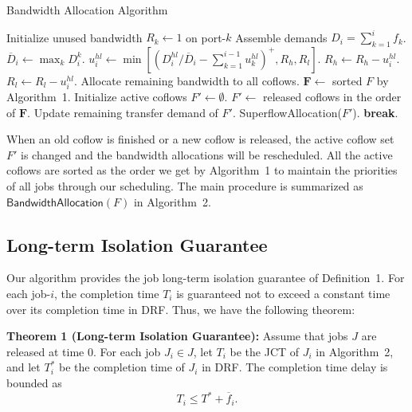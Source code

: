 \documentclass[10pt,journal,compsoc]{IEEEtran}
\begin{document}
\begin{algorithm}
	\caption{Bandwidth Allocation Algorithm}
	\begin{algorithmic}[1]
			\State Initialize unused bandwidth $R_k \gets 1$ on port-$k$
				\State Assemble demands $D_i = \sum_{k=1}^if_k$.
				\State $\overline{D}_i \gets \max_kD_i^k$.
					\State $u_i^{hl} \gets \min[(D_i^{hl}/\overline{D}_i - \sum_{k=1}^{i-1}u_k^{hl})^+, R_h,R_l]$.
					\State $R_h \gets R_h - u_i^{hl}$.
					\State $R_l \gets R_l - u_i^{hl}$.
				\EndFor
			\EndFor
			\State Allocate remaining bandwidth to all coflows.%
		\EndProcedure
			\State $\mathbf{F} \gets$ sorted $F$ by Algorithm~1.
			\State Initialize active coflows $F' \gets \emptyset$.
				\State $F' \gets$ released coflows in the order of $\mathbf{F}$.
					\State Update remaining transfer demand of $F'$.
					\State SuperflowAllocation($F'$).
				\EndIf
					\State \textbf{break}.
				\EndIf
			\EndWhile
		\EndProcedure
	\end{algorithmic}
\end{algorithm}

When an old coflow is finished or a new coflow is released, the active coflow set $F'$ is changed and the bandwidth allocations will be rescheduled.
%
All the active coflows are sorted as the order we get by Algorithm~1 to maintain the priorities of all jobs through our scheduling.
%
The main procedure is summarized as $\mathsf{BandwidthAllocation}(F)$ in Algorithm~2.

\subsection{Long-term Isolation Guarantee}
Our algorithm provides the job long-term isolation guarantee of Definition~1.
%
For each job-$i$, the completion time $T_i$ is guaranteed not to exceed a constant time over its completion time in DRF.
%
Thus, we have the following theorem:

\textbf{Theorem 1 (Long-term Isolation Guarantee):} Assume that jobs $J$ are released at time 0.
%
For each job $J_i \in J$, let $T_i$ be the JCT of $J_i$ in Algorithm~2, and let $T_i^*$ be the completion time of $J_i$ in DRF. The completion time delay is bounded as
\begin{equation}
	T_i \leq T^* + \overline{f}_i.
\end{equation}
\end{document}
